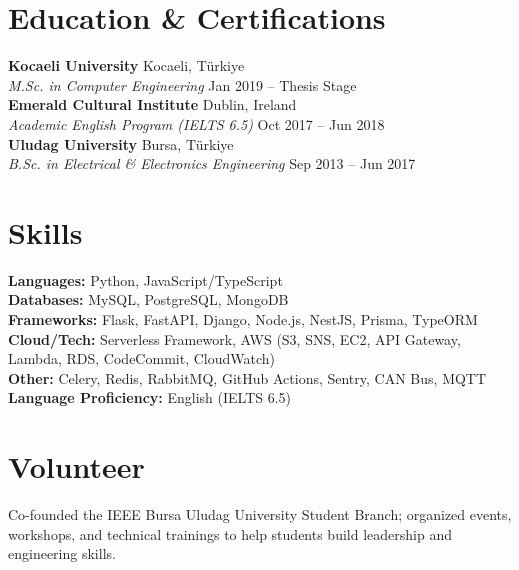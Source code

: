 \documentclass[10pt,a4paper]{extarticle}
\begin{document}
\section{Education \& Certifications}
\textbf{Kocaeli University} \hfill Kocaeli, Türkiye\\
\textit{M.Sc. in Computer Engineering} \hfill Jan 2019 -- Thesis Stage\\[4pt]
\textbf{Emerald Cultural Institute} \hfill Dublin, Ireland\\
\textit{Academic English Program (IELTS 6.5)} \hfill Oct 2017 -- Jun 2018\\[4pt]
\textbf{Uludag University} \hfill Bursa, Türkiye\\
\textit{B.Sc. in Electrical \& Electronics Engineering} \hfill Sep 2013 -- Jun 2017\\[6pt]


\section{Skills}
\textbf{Languages:} Python, JavaScript/TypeScript\\
\textbf{Databases:} MySQL, PostgreSQL, MongoDB\\
\textbf{Frameworks:} Flask, FastAPI, Django, Node.js, NestJS, Prisma, TypeORM\\
\textbf{Cloud/Tech:} Serverless Framework, AWS (S3, SNS, EC2, API Gateway, Lambda, RDS, CodeCommit, CloudWatch)\\
\textbf{Other:} Celery, Redis, RabbitMQ, GitHub Actions, Sentry, CAN Bus, MQTT\\
\textbf{Language Proficiency:} English (IELTS 6.5)

\section{Volunteer}
Co-founded the IEEE Bursa Uludag University Student Branch; organized events, workshops, and technical trainings to help students build leadership and engineering skills.
\end{document}
